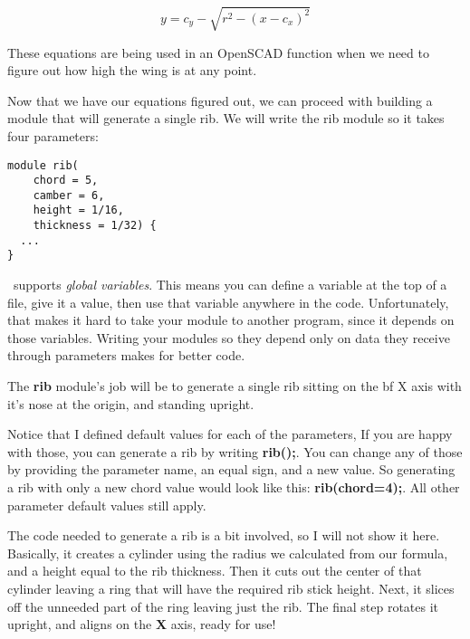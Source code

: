 \begin{equation}
  y = c_y - \sqrt{r^2 - (x - c_x)^{2}}
\end{equation}

These equations are being used in an OpenSCAD function when we need to figure out how high the wing is at any point.






Now that we have our equations figured out, we can proceed with building a
module that will generate a single rib. We will write the rib module so it
takes four parameters:

\begin{lstlisting}
module rib(
    chord = 5,
    camber = 6,
    height = 1/16,
    thickness = 1/32) {
  ...
}
\end{lstlisting}

\osc\ supports {\it global variables}. This means you
can define a variable at the top of a file,  give it a value, then use
that variable anywhere in the code. Unfortunately, that makes it hard to take
your module to another program, since it depends on those variables. Writing
your modules so they depend only on data they receive through parameters makes
for better code.

The {\bf rib} module's job will be to generate a single rib sitting on the {bf X} axis
with it's nose at the origin, and standing upright.

Notice that I defined  default values for each of the parameters, If you are
happy with those, you can generate a rib by writing {\bf rib();}. You can
change any of those by providing the parameter name, an equal sign, and a new
value. So generating a rib with only a new chord value would look like this:
{\bf rib(chord=4);}. All other parameter default values still apply.

The code needed to generate a rib is a bit involved, so I will not show it
here. Basically, it creates a cylinder using the radius we calculated from our
formula, and a height equal to the rib thickness.  Then it cuts out the center
of that cylinder leaving a ring that will have the required rib stick height.
Next, it slices off the unneeded part of the ring leaving just the rib. The
final step rotates it upright, and aligns on the {\bf X} axis, ready for use!

